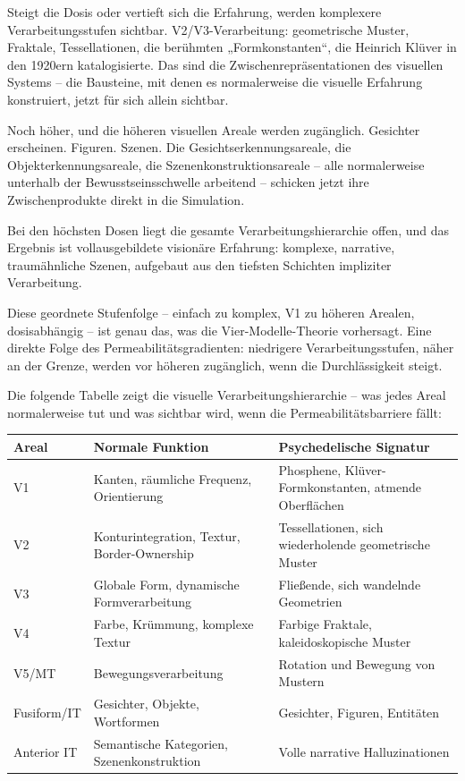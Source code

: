 \documentclass[11pt, twoside, openright]{book}
\begin{document}
Steigt die Dosis oder vertieft sich die Erfahrung, werden komplexere Verarbeitungsstufen sichtbar. V2/V3-Verarbeitung: geometrische Muster, Fraktale, Tessellationen, die berühmten „Formkonstanten“, die Heinrich Klüver in den 1920ern katalogisierte. Das sind die Zwischenrepräsentationen des visuellen Systems -- die Bausteine, mit denen es normalerweise die visuelle Erfahrung konstruiert, jetzt für sich allein sichtbar.

Noch höher, und die höheren visuellen Areale werden zugänglich. Gesichter erscheinen. Figuren. Szenen. Die Gesichtserkennungsareale, die Objekterkennungsareale, die Szenenkonstruktionsareale -- alle normalerweise unterhalb der Bewusstseinsschwelle arbeitend -- schicken jetzt ihre Zwischenprodukte direkt in die Simulation.

Bei den höchsten Dosen liegt die gesamte Verarbeitungshierarchie offen, und das Ergebnis ist vollausgebildete visionäre Erfahrung: komplexe, narrative, traumähnliche Szenen, aufgebaut aus den tiefsten Schichten impliziter Verarbeitung.

Diese geordnete Stufenfolge -- einfach zu komplex, V1 zu höheren Arealen, dosisabhängig -- ist genau das, was die Vier-Modelle-Theorie vorhersagt. Eine direkte Folge des Permeabilitätsgradienten: niedrigere Verarbeitungsstufen, näher an der Grenze, werden vor höheren zugänglich, wenn die Durchlässigkeit steigt.

Die folgende Tabelle zeigt die visuelle Verarbeitungshierarchie -- was jedes Areal normalerweise tut und was sichtbar wird, wenn die Permeabilitätsbarriere fällt:


{\footnotesize
\noindent
\begin{tabularx}{\linewidth}{Y Y Y}
\toprule
\textbf{Areal} & \textbf{Normale Funktion} & \textbf{Psychedelische Signatur} \\
\midrule
V1 & Kanten, räumliche Frequenz, Orientierung & Phosphene, Klüver-Formkonstanten, atmende Oberflächen \\[4pt]
V2 & Konturintegration, Textur, Border-Ownership & Tessellationen, sich wiederholende geometrische Muster \\[4pt]
V3 & Globale Form, dynamische Form\-ver\-ar\-bei\-tung & Fließende, sich wandelnde Geometrien \\[4pt]
V4 & Farbe, Krümmung, komplexe Textur & Farbige Fraktale, ka\-lei\-do\-sko\-pi\-sche Muster \\[4pt]
V5/MT & Bewegungs\-ver\-ar\-bei\-tung & Rotation und Bewegung von Mustern \\[4pt]
Fusiform/IT & Gesichter, Objekte, Wortformen & Gesichter, Figuren, Entitäten \\[4pt]
Anterior IT & Semantische Kategorien, Sze\-nen\-kon\-struk\-ti\-on & Volle narrative Hal\-lu\-zi\-na\-tio\-nen \\[4pt]
\bottomrule
\end{tabularx}
}
\end{document}
